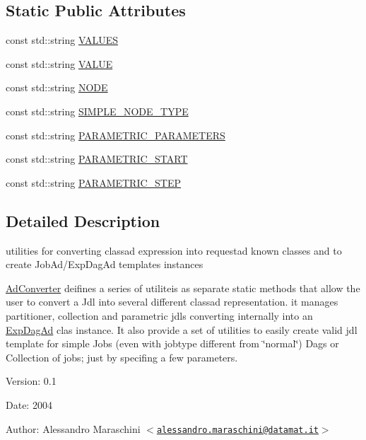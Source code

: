 \subsection*{Static Public Attributes}
\begin{CompactItemize}
\item 
const std::string \hyperlink{classglite_1_1wms_1_1jdl_1_1AdConverter_s0}{VALUES}
\item 
const std::string \hyperlink{classglite_1_1wms_1_1jdl_1_1AdConverter_s1}{VALUE}
\item 
const std::string \hyperlink{classglite_1_1wms_1_1jdl_1_1AdConverter_s2}{NODE}
\item 
const std::string \hyperlink{classglite_1_1wms_1_1jdl_1_1AdConverter_s3}{SIMPLE\_\-NODE\_\-TYPE}
\item 
const std::string \hyperlink{classglite_1_1wms_1_1jdl_1_1AdConverter_s4}{PARAMETRIC\_\-PARAMETERS}
\item 
const std::string \hyperlink{classglite_1_1wms_1_1jdl_1_1AdConverter_s5}{PARAMETRIC\_\-START}
\item 
const std::string \hyperlink{classglite_1_1wms_1_1jdl_1_1AdConverter_s6}{PARAMETRIC\_\-STEP}
\end{CompactItemize}


\subsection{Detailed Description}
utilities for converting classad expression into requestad known classes and to create Job\-Ad/Exp\-Dag\-Ad templates instances 

\hyperlink{classglite_1_1wms_1_1jdl_1_1AdConverter}{Ad\-Converter} deifines a series of utiliteis as separate static methods that allow the user to convert a Jdl into several different classad representation. it manages partitioner, collection and parametric jdls converting internally into an \hyperlink{classglite_1_1wms_1_1jdl_1_1ExpDagAd}{Exp\-Dag\-Ad} clas instance. It also provide a set of utilities to easily create valid jdl template for simple Jobs (even with jobtype different from \char`\"{}normal\char`\"{}) Dags or Collection of jobs; just by specifing a few parameters.

\begin{Desc}
\item[Version:]0.1 \end{Desc}
\begin{Desc}
\item[Date:]2004 \end{Desc}
\begin{Desc}
\item[Author:]Alessandro Maraschini $<$\href{mailto:alessandro.maraschini@datamat.it}{\tt alessandro.maraschini@datamat.it}$>$ \end{Desc}




